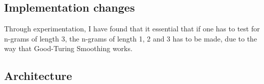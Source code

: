 \subsection{Implementation changes}
Through experimentation, I have found that it essential that if one has to test for n-grams of length 3, the n-grams of length 1, 2 and 3 has to be made, due to the way that Good-Turing Smoothing works.

\subsection{Architecture}

